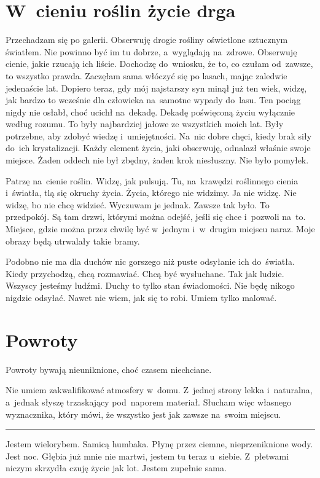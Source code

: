 \documentclass[9pt, a5paper]{memoir}
\begin{document}
\section{W~cieniu roślin życie drga}
Przechadzam się po galerii. Obserwuję drogie rośliny oświetlone sztucznym światłem. Nie powinno być im tu dobrze, a~wyglądają na~zdrowe. Obserwuję cienie, jakie rzucają ich liście. Dochodzę do~wniosku, że to, co czułam od~zawsze, to wszystko prawda. Zaczęłam sama włóczyć się po lasach, mając zaledwie jedenaście lat. Dopiero teraz, gdy mój najstarszy syn minął już ten wiek, widzę, jak bardzo to wcześnie dla człowieka na~samotne wypady do~lasu. Ten pociąg nigdy nie osłabł, choć ucichł na~dekadę. Dekadę poświęconą życiu wyłącznie według rozumu. To były najbardziej jałowe ze wszystkich moich lat. Były potrzebne, aby zdobyć wiedzę i~umiejętności. Na~nic dobre chęci, kiedy brak siły do~ich krystalizacji. Każdy element życia, jaki obserwuję, odnalazł właśnie swoje miejsce. Żaden oddech nie był zbędny, żaden krok niesłuszny. Nie było pomyłek.

Patrzę na~cienie roślin. Widzę, jak pulsują. Tu, na~krawędzi roślinnego cienia i~światła, tlą się okruchy życia. Życia, którego nie widzimy. Ja nie widzę. Nie widzę, bo nie chcę widzieć. Wyczuwam je jednak. Zawsze tak było. To przedpokój. Są tam drzwi, którymi można odejść, jeśli się chce i~pozwoli na~to. Miejsce, gdzie można przez chwilę być w~jednym i~w~drugim miejscu naraz. Moje obrazy będą utrwalały takie bramy.

Podobno nie ma dla duchów nic gorszego niż puste odsyłanie ich do~światła. Kiedy przychodzą, chcą rozmawiać. Chcą być wysłuchane. Tak jak ludzie. Wszyscy jesteśmy ludźmi. Duchy to tylko stan świadomości. Nie będę nikogo nigdzie odsyłać. Nawet nie wiem, jak się to robi. Umiem tylko malować.

\newpage
\section{Powroty}
Powroty bywają nieuniknione, choć czasem niechciane.

Nie umiem zakwalifikować atmosfery w~domu. Z~jednej strony lekka i~naturalna, a~jednak słyszę trzaskający pod~naporem materiał. Słucham więc własnego wyznacznika, który mówi, że wszystko jest jak zawsze na~swoim miejscu.

\fancybreak{* \quad * \quad *}
Jestem wielorybem. Samicą humbaka. Płynę przez ciemne, nieprzeniknione wody. Jest noc. Głębia już mnie nie martwi, jestem tu teraz u~siebie. Z~płetwami niczym skrzydła czuję życie jak lot. Jestem zupełnie sama.
\end{document}

